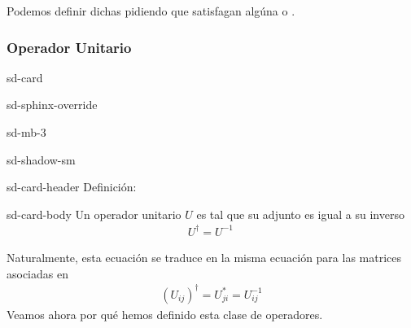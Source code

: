 \documentclass[letterpaper,10pt,english]{jupyterBook}
\begin{document}
\sphinxAtStartPar
Podemos definir dichas   pidiendo que satisfagan algúna  o .


\subsubsection{Operador Unitario}
\label{\detokenize{docs/Part_01_Formalismo/Chapter_01_02_Formalismo_matem_xe1tico/01_03_Operadores_myst:operador-unitario}}
\sphinxAtStartPar


\begin{sphinxuseclass}{sd-card}
\begin{sphinxuseclass}{sd-sphinx-override}
\begin{sphinxuseclass}{sd-mb-3}
\begin{sphinxuseclass}{sd-shadow-sm}
\begin{sphinxuseclass}{sd-card-header}
\sphinxAtStartPar
Definición:

\end{sphinxuseclass}
\begin{sphinxuseclass}{sd-card-body}
\sphinxAtStartPar
Un operador unitario \(U\) es tal que su adjunto es igual a su inverso
\begin{equation*}
\begin{split}
U^\dagger = U^{-1}  \, 
\end{split}
\end{equation*}
\end{sphinxuseclass}
\end{sphinxuseclass}
\end{sphinxuseclass}
\end{sphinxuseclass}
\end{sphinxuseclass}
\sphinxAtStartPar
Naturalmente, esta ecuación se traduce en la misma ecuación para las matrices asociadas en 
\begin{equation*}
\begin{split}
(U_{ij})^\dagger = U_{ji}^* = U^{-1}_{ij}
\end{split}
\end{equation*}
\sphinxAtStartPar
Veamos ahora por qué hemos definido esta clase de operadores.
\end{document}
